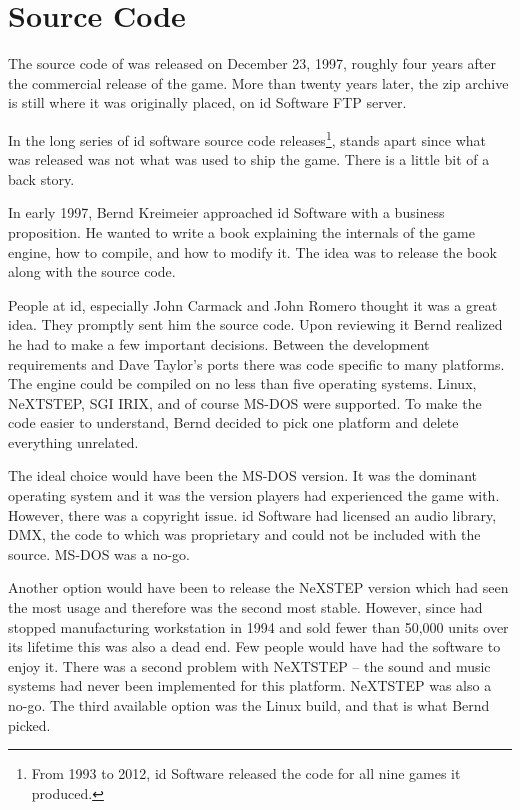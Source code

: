 \section{Source Code}
The source code of \doom{} was released on December 23, 1997, roughly four years after the commercial release of the game. More than twenty years later, the zip archive is still where it was originally placed, on id Software FTP server.\\
\par
{}
\par
 In the long series of id software source code releases\footnote{From 1993 to 2012, id Software released the code for all nine games it produced.}, \doom{} stands apart since what was released was not what was used to ship the game. There is a little bit of a back story.\\
 \par
 In early 1997, Bernd Kreimeier approached id Software with a business proposition. He wanted to write a book explaining the internals of the game engine, how to compile, and how to modify it. The idea was to release the book along with the source code.\\
 \par
  People at id, especially John Carmack and John Romero thought it was a great idea. They promptly sent him the source code. Upon reviewing it Bernd realized he had to make a few important decisions. Between the development requirements and Dave Taylor's ports there was code specific to many platforms. The engine could be compiled on no less than five operating systems. Linux, NeXTSTEP, SGI IRIX, and of course MS-DOS were supported. To make the code easier to understand, Bernd decided to pick one platform and delete everything unrelated.\\
  \par
  The ideal choice would have been the MS-DOS version. It was the dominant operating system and it was the version players had experienced the game with. However, there was a copyright issue. id Software had licensed an audio library, DMX, the code to which was proprietary and could not be included with the source. MS-DOS was a no-go.\\
  \par
   Another option would have been to release the NeXSTEP version which had seen the most usage and therefore was the second most stable. However, since \NeXT had stopped manufacturing workstation in 1994 and sold fewer than 50,000 units over its lifetime this was also a dead end. Few people would have had the software to enjoy it. There was a second problem with NeXTSTEP -- the sound and music systems had never been implemented for this platform. NeXTSTEP was also a no-go. The third available option was the Linux build, and that is what Bernd picked.\\
